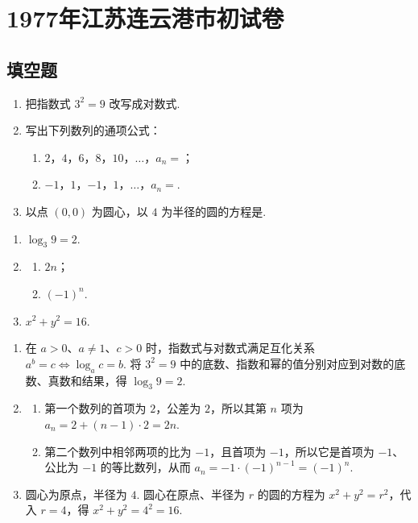 \chapter{1977年江苏连云港市初试卷}

\section{填空题}

\begin{problem}
\begin{enumerate}
  \item 把指数式 \(3^{2}=9\) 改写成对数式\fillinblank{}.
  \item 写出下列数列的通项公式：
  \begin{enumerate}
    \item \(2\)，\(4\)，\(6\)，\(8\)，\(10\)，\(\ldots\)，\(a_n=\)\fillinblank{}；
    \item \(-1\)，\(1\)，\(-1\)，\(1\)，\(\ldots\)，\(a_n=\)\fillinblank{}.
  \end{enumerate}
  \item 以点 \((0,0)\) 为圆心，以 \(4\) 为半径的圆的方程是\fillinblank{}.
\end{enumerate}
\end{problem}

\begin{answer}
\begin{enumerate}
  \item \(\log_{3}9=2\).
  \item
  \begin{enumerate}
    \item \(2n\)；
    \item \((-1)^n\).
  \end{enumerate}
  \item \(x^2+y^2=16\).
\end{enumerate}
\end{answer}

\begin{solution}
\begin{enumerate}
  \item 在 \(a>0\)、\(a\neq1\)、\(c>0\) 时，指数式与对数式满足互化关系 \(a^{b}=c\Longleftrightarrow\log_{a}c=b\). 将 \(3^{2}=9\) 中的底数、指数和幂的值分别对应到对数的底数、真数和结果，得 \(\log_{3}9=2\).
  \item
  \begin{enumerate}
    \item 第一个数列的首项为 \(2\)，公差为 \(2\)，所以其第 \(n\) 项为 \(a_n=2+(n-1)\cdot2=2n\).
    \item 第二个数列中相邻两项的比为 \(-1\)，且首项为 \(-1\)，所以它是首项为 \(-1\)、公比为 \(-1\) 的等比数列，从而 \(a_n=-1\cdot(-1)^{n-1}=(-1)^n\).
  \end{enumerate}
  \item 圆心为原点，半径为 \(4\). 圆心在原点、半径为 \(r\) 的圆的方程为 \(x^2+y^2=r^2\)，代入 \(r=4\)，得 \(x^2+y^2=4^2=16\).
\end{enumerate}
\end{solution}

